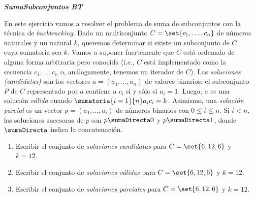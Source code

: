 {\small
  \begin{enunciado}{\ejercicio[SumaSubconjuntos BT]}
    \textbf{\textit{SumaSubconjuntos BT}}

    En este ejercicio vamos a resolver el problema de suma de subconjuntos con la técnica de \textit{backtracking}.
    Dado un multiconjunto $C = \set{c_1 ,\ldots, c_n }$ de números naturales y un natural $k$, queremos
    determinar si existe un subconjunto de $C$ cuya sumatoria sea $k$.
    Vamos a suponer fuertemente
    que $C$ está ordenado de alguna forma arbitraria pero conocida (i.e., $C$ está implementado como
    la secuencia $c_1, \ldots, c_n$ o, análogamente, tenemos un iterador de $C$).
    Las \textit{soluciones (candidatas)}
    son los vectores $a = (a_1 ,\ldots, a_n)$ de valores binarios; el subconjunto $P$
    de $C$ representado por $a$ contiene a $c_i$ si y sólo si $a_i = 1$.
    Luego, $a$ es una solución \textit{válida} cuando $\sumatoria{i=1}{n} a_i c_i = k$.
    Asimismo, una \textit{solución parcial} es un vector $p = (a_1 ,\ldots , a_i)$ de números binarios con
    $0 \leq i \leq n$. Si $i < n$, las soluciones sucesoras de $p$ son $p \sumaDirecta 0$ y
    $p \sumaDirecta 1$, donde $\sumaDirecta$ indica la concatenación.

    \begin{enumerate}[label=$\alph*)$]
      \item Escribir el conjunto de \textit{soluciones candidatas} para $C = \set{6, 12, 6}$ y $k = 12$.
      \item Escribir el conjunto de \textit{soluciones válidas} para $C = \set{6, 12, 6}$ y $k = 12$.
      \item Escribir el conjunto de \textit{soluciones parciales} para $C = \set{6, 12, 6}$ y $k = 12$.


\end{enumerate}
\end{enunciado}}
